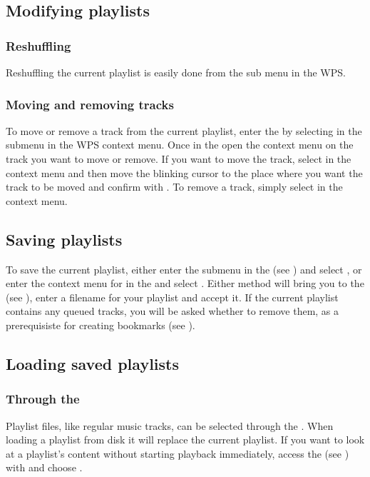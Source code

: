 \subsection{Modifying playlists}
\subsubsection{Reshuffling}
Reshuffling the current playlist is easily done from the 
sub menu in the WPS.

\subsubsection{Moving and removing tracks}
To move or remove a track from the current playlist, enter the
 by selecting  in the
 submenu in the WPS context menu.
Once in the  open the context menu on the track you
want to move or remove. If you want to move the track, select  in
the context menu and then move the blinking cursor to the place where you want
the track to be moved and confirm with \ActionStdOk. To remove a track, simply
select  in the context menu.

\subsection{Saving playlists}
To save the current playlist, either enter the  submenu
in the  (see ) and
select , or enter the context menu for
 in the  and select
.
Either method will bring you to the  (see
), enter a filename for your playlist and
accept it. If the current playlist contains any queued tracks, you will be
asked whether to remove them, as a prerequisiste for creating bookmarks
(see ).

\subsection{Loading saved playlists}
\subsubsection{Through the }
Playlist files, like regular music tracks, can be selected through the
. When loading a playlist from disk it will replace
the current playlist. If you want to look at a playlist's
content without starting playback immediately, access the  (see
) with \ActionStdContext{} and choose .

